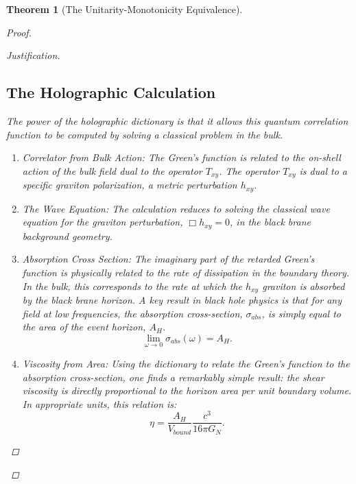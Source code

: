 \documentclass[11pt, letterpaper]{report}
\theoremstyle{plain} %
\newtheorem{theorem}{Theorem}[chapter]
\theoremstyle{definition} %
\theoremstyle{remark} %
\begin{document}
\begin{theorem}[The Unitarity-Monotonicity Equivalence]
\begin{proof}
\begin{proof}[Justification]
\subsection{The Holographic Calculation}
The power of the holographic dictionary is that it allows this quantum correlation function to be computed by solving a classical problem in the bulk.
\begin{enumerate}
    \item Correlator from Bulk Action: The Green's function is related to the on-shell action of the bulk field dual to the operator $T_{xy}$. The operator $T_{xy}$ is dual to a specific graviton polarization, a metric perturbation $h_{xy}$.
    \item The Wave Equation: The calculation reduces to solving the classical wave equation for the graviton perturbation, $\Box h_{xy} = 0$, in the black brane background geometry.
    \item Absorption Cross Section: The imaginary part of the retarded Green's function is physically related to the rate of dissipation in the boundary theory. In the bulk, this corresponds to the rate at which the $h_{xy}$ graviton is absorbed by the black brane horizon. A key result in black hole physics is that for any field at low frequencies, the absorption cross-section, $\sigma_{abs}$, is simply equal to the area of the event horizon, $A_H$.
    \begin{equation}
        \lim_{\omega\to 0} \sigma_{abs}(\omega) = A_H.
    \end{equation}
    \item Viscosity from Area: Using the dictionary to relate the Green's function to the absorption cross-section, one finds a remarkably simple result: the shear viscosity is directly proportional to the horizon area per unit boundary volume. In appropriate units, this relation is:
    \begin{equation}
        \eta = \frac{A_H}{V_{bound}} \frac{c^3}{16\pi G_N}.
    \end{equation}
\end{enumerate}


\end{proof}
\end{proof}
\end{theorem}
\end{document}
